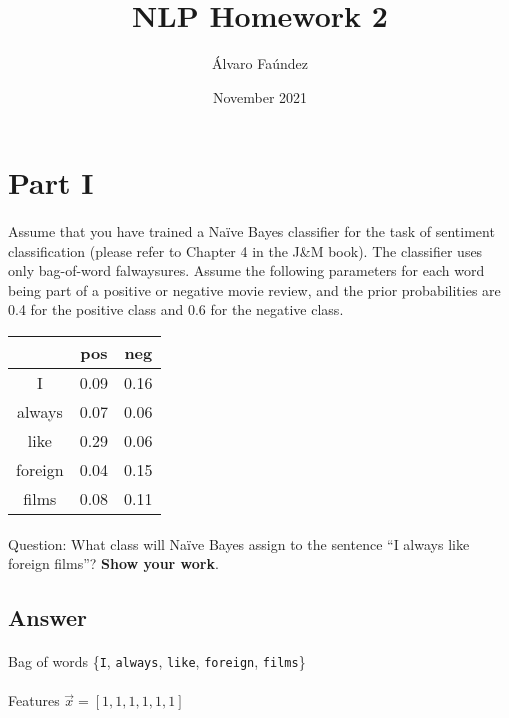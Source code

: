 \documentclass{article}
\title{NLP Homework 2}
\author{Álvaro Faúndez}
\date{November 2021}
\begin{document}
\maketitle

\section*{Part I}

\paragraph{} Assume that you have trained a Naïve Bayes classifier for the task of sentiment classification (please refer to Chapter 4 in the J\&M book). The classifier uses only bag-of-word falwaysures. Assume the following parameters for each word being part of a positive or negative movie review, and the prior probabilities are 0.4 for the positive class and 0.6 for the negative class.

\begin{tabular}{c c c}
    \toprule
     & \textbf{pos} & \textbf{neg} \\
    \midrule
    I & 0.09 & 0.16 \\
    always & 0.07 & 0.06 \\
    like & 0.29 & 0.06 \\
    foreign & 0.04 & 0.15 \\
    films & 0.08 & 0.11 \\
    \bottomrule
\end{tabular}

\paragraph{} Question: What class will Naïve Bayes assign to the sentence “I always like foreign films”? \textbf{Show your work}.

\clearpage

\subsection*{Answer}

\paragraph{} Bag of words \{\texttt{I}, \texttt{always}, \texttt{like}, \texttt{foreign}, \texttt{films}\}

\paragraph{} Features \(\vec{x} = [1, 1, 1, 1, 1, 1]\)
\end{document}

